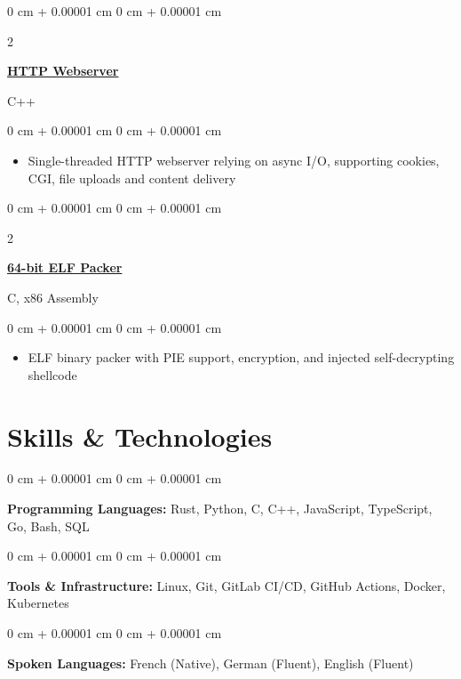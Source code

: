 \documentclass[10pt, letterpaper]{article}
\newenvironment{highlights}{
    \begin{itemize}[
        topsep=0.10 cm,
        parsep=0.10 cm,
        partopsep=0pt,
        itemsep=0pt,
        leftmargin=0 cm + 10pt
    ]
}{
    \end{itemize}
}
\newenvironment{onecolentry}{
    \begin{adjustwidth}{
        0 cm + 0.00001 cm
    }{
        0 cm + 0.00001 cm
    }
}{
    \end{adjustwidth}
}
\newenvironment{twocolentry}[2][]{
    \onecolentry
    \def\secondColumn{#2}
    \setcolumnwidth{\fill, 4.5 cm}
    \begin{paracol}{2}
}{
    \switchcolumn \raggedleft \secondColumn
    \end{paracol}
    \endonecolentry
}
\begin{document}
    \vspace{0.1 cm}

    \begin{twocolentry}
        {C++}
        \href{https://github.com/winstonallo/webserv}{\textbf{HTTP Webserver}}
    \end{twocolentry}

    \vspace{0.05 cm}
    
    \begin{onecolentry}
        \begin{highlights}
            \item Single-threaded HTTP webserver relying on async I/O, supporting cookies, CGI, file uploads and content delivery
        \end{highlights}
    \end{onecolentry}

    \vspace{0.2 cm}


    \begin{twocolentry}
        {C, x86 Assembly}
        \href{https://github.com/winstonallo/woody-woodpacker}{\textbf{64-bit ELF Packer}}
    \end{twocolentry}

    \vspace{0.10 cm}

    \begin{onecolentry}
        \begin{highlights}
            \item ELF binary packer with PIE support, encryption, and injected self-decrypting shellcode
        \end{highlights}
    \end{onecolentry}

    \section{Skills \& Technologies}

    \begin{onecolentry}
        \textbf{Programming Languages:} Rust, Python, C, C++, JavaScript, TypeScript, Go, Bash, SQL
    \end{onecolentry}

    \vspace{0.1 cm}

    \begin{onecolentry}
        \textbf{Tools \& Infrastructure:} Linux, Git, GitLab CI/CD, GitHub Actions, Docker, Kubernetes
    \end{onecolentry}

    \vspace{0.1 cm}
    
    \begin{onecolentry}
        \textbf{Spoken Languages:} French (Native), German (Fluent), English (Fluent)
    \end{onecolentry}
    
\end{document}
